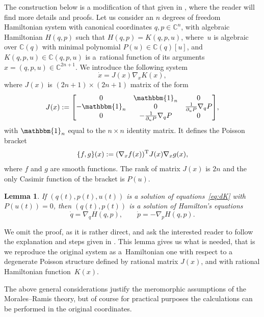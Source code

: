 \documentclass[pdftex]{sigma}
\numberwithin{equation}{section}
\newtheorem{Lemma}[Theorem]{Lemma}
 { \theoremstyle{definition}
\newtheorem{Remark}[Theorem]{Remark} }
\begin{document}
The construction below is a modification of that given in
\cite{alg}, where the reader will find more details and proofs. Let us
consider an $n$ degrees of freedom Hamiltonian system with canonical
coordinates $q,p\in\mathbb{C}^n$, with algebraic Hamiltonian $H(q,p)$
such that $H(q,p)=K(q,p,u)$, where~$u$ is algebraic over
$\mathbb{C}(q)$ with minimal polynomial $P(u)\in\mathbb{C}(q)[u]$, and
$K(q,p,u)\in \mathbb{C}(q,p,u)$ is a~rational function of its
arguments $x=(q,p,u)\in\mathbb{C}^{2n+1}$. We introduce the following
system
\begin{equation}
 \label{eq:dK}
 \dot x = J(x) \nabla_xK(x),
\end{equation}
where $J(x)$ is $(2n+1)\times(2n+1)$ matrix of the form
\begin{equation*}
 J(x):=\begin{bmatrix}
 0 & \mathbbm{1}_n & 0 \\
 -\mathbbm{1}_n & 0 & \frac{1}{\partial_u P}\nabla_q P \\
 0 & -\frac{1}{\partial_u P} \nabla_q P& 0
 \end{bmatrix}\!,
\end{equation*}
with $\mathbbm{1}_n$ equal to the $n\times n$ identity matrix. It defines the Poisson bracket
\begin{equation*}
 \{f,g\}(x) := (\nabla_xf(x))^{\rm T} J(x)\nabla_xg(x),
\end{equation*}
where $f$ and $g$ are smooth functions. The rank of matrix $J(x)$ is
$2n$ and the only Casimir function of the bracket is $P(u)$.
\begin{Lemma}
{\sloppy If $(q(t),p(t),u(t))$ is a solution of equations~\eqref{eq:dK} with
 $P(u(t))=0$, then $(q(t),p(t))$ is a solution of Hamilton's
 equations
 \begin{equation*}
 \dot q= \nabla_q H(q,p), \qquad
 \dot p=-\nabla_p H(q,p).
 \end{equation*}}
\end{Lemma}
We omit the proof, as it is rather direct, and ask the interested reader to follow the explanation and steps given in \cite[Section~2]{alg}. This lemma gives us what is needed, that is we reproduce the original system as a~Hamiltonian one with respect to a degenerate Poisson structure defined
by rational matrix $J(x)$, and with rational Hamiltonian function~$K(x)$.

The above general considerations justify the meromorphic assumptions
of the Morales--Ramis theory, but of course for practical purposes the
calculations can be performed in the original coordinates.
\end{document}
